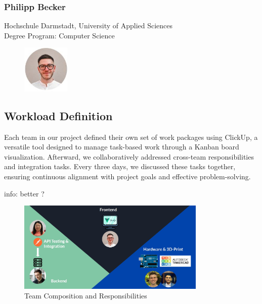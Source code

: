 \subsubsection{Philipp Becker}
Hochschule Darmstadt, University of Applied Sciences \\
Degree Program: Computer Science
\begin{figure}[h]
    \centering
    \includegraphics[width=0.2\textwidth]{images/philipp.JPG}
\end{figure}

\subsection{Workload Definition}

Each team in our project defined their own set of work packages using ClickUp, a versatile tool designed to manage task-based work through a Kanban board visualization. Afterward, we collaboratively addressed cross-team responsibilities and integration tasks. Every three days, we discussed these tasks together, ensuring continuous alignment with project goals and effective problem-solving.

info: better ?

\begin{figure}[h]
    \centering
    \includegraphics[width=0.8\textwidth]{images/workload.JPG}
    \caption{Team Composition and Responsibilities}
\end{figure}




